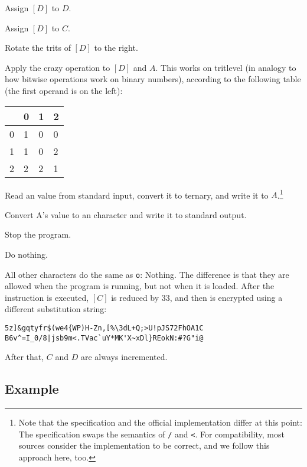 \begin{description}[labelsep=1em]
    \item[\texttt{j}] Assign $[D]$ to $D$.
    \item[\texttt{i}] Assign $[D]$ to $C$.
    \item[\texttt{*}] Rotate the trits of $[D]$ to the right.
    \item[\texttt{p}] Apply the crazy operation to $[D]$ and $A$. This works on tritlevel (in analogy to how bitwise operations work on binary numbers), according to the following table (the first operand is on the left):

     \begin{tabular}{l|lll}
     & 0 & 1 & 2\\
     \hline
     0 & 1 & 0 & 0\\
     1 & 1 & 0 & 2\\
     2 & 2 & 2 & 1
     \end{tabular}

    \item[\texttt{/}] Read an \ascii{} value from standard input, convert it to ternary, and write it to $A$.\footnote{Note that the specification and the official implementation differ at this point: The specification swaps the semantics of \texttt{/} and \texttt{<}. For compatibility, most sources consider the implementation to be correct, and we follow this approach here, too.}
    \item[\texttt{<}] Convert A's value to an \ascii{} character and write it to standard output.
    \item[\texttt{v}] Stop the program.
    \item[\texttt{o}] Do nothing.
\end{description}

All other characters do the same as \texttt{o}: Nothing. The difference is that they are allowed when the program is running, but not when it is loaded. After the instruction is executed, $[C]$ is reduced by 33, and then is encrypted using a different substitution string:

\begin{lstlisting}[numbers=none,frame=none]
5z]&gqtyfr$(we4{WP)H-Zn,[%\3dL+Q;>U!pJS72FhOA1C
B6v^=I_0/8|jsb9m<.TVac`uY*MK'X~xDl}REokN:#?G"i@
\end{lstlisting}

After that, $C$ and $D$ are always incremented.

\subsection{Example}
\label{malbolge-example}

